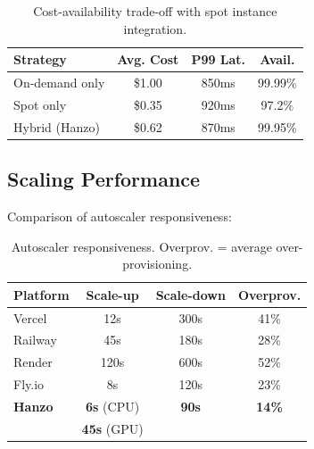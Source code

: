 \begin{table}[H]
\centering
\small
\begin{tabular}{lccc}
\toprule
\textbf{Strategy} & \textbf{Avg. Cost} & \textbf{P99 Lat.} & \textbf{Avail.} \\
\midrule
On-demand only & \$1.00 & 850ms & 99.99\% \\
Spot only & \$0.35 & 920ms & 97.2\% \\
Hybrid (Hanzo) & \$0.62 & 870ms & 99.95\% \\
\bottomrule
\end{tabular}
\caption{Cost-availability trade-off with spot instance integration.}
\label{tab:spot}
\end{table}

\subsection{Scaling Performance}

Comparison of autoscaler responsiveness:

\begin{table}[H]
\centering
\small
\begin{tabular}{lccc}
\toprule
\textbf{Platform} & \textbf{Scale-up} & \textbf{Scale-down} & \textbf{Overprov.} \\
\midrule
Vercel & 12s & 300s & 41\% \\
Railway & 45s & 180s & 28\% \\
Render & 120s & 600s & 52\% \\
Fly.io & 8s & 120s & 23\% \\
\textbf{Hanzo} & \textbf{6s} (CPU) & \textbf{90s} & \textbf{14\%} \\
 & \textbf{45s} (GPU) & & \\
\bottomrule
\end{tabular}
\caption{Autoscaler responsiveness. Overprov. = average over-provisioning.}
\label{tab:scaling}
\end{table}

